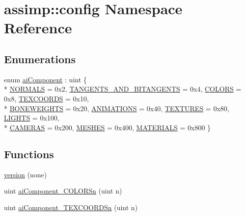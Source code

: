 \hypertarget{namespaceassimp_1_1config}{\section{assimp\+:\+:config Namespace Reference}
\label{namespaceassimp_1_1config}
}
\subsection*{Enumerations}
\begin{DoxyCompactItemize}
\item 
enum \hyperlink{namespaceassimp_1_1config_ad1b64b8f67159b86655b820ed6f75e62}{ai\+Component} \+: uint \{ \\*
\hyperlink{namespaceassimp_1_1config_ad1b64b8f67159b86655b820ed6f75e62a3036ae84279c4847b9d225ad8ff4a93d}{N\+O\+R\+M\+A\+L\+S} = 0x2, 
\hyperlink{namespaceassimp_1_1config_ad1b64b8f67159b86655b820ed6f75e62a0ccc4db28b70bd3cc3570e0b07dc875f}{T\+A\+N\+G\+E\+N\+T\+S\+\_\+\+A\+N\+D\+\_\+\+B\+I\+T\+A\+N\+G\+E\+N\+T\+S} = 0x4, 
\hyperlink{namespaceassimp_1_1config_ad1b64b8f67159b86655b820ed6f75e62a4ae7c781c0d6819cbef78edf2cc0120c}{C\+O\+L\+O\+R\+S} = 0x8, 
\hyperlink{namespaceassimp_1_1config_ad1b64b8f67159b86655b820ed6f75e62a1364ad1331ee57b8a3981a9143fc697e}{T\+E\+X\+C\+O\+O\+R\+D\+S} = 0x10, 
\\*
\hyperlink{namespaceassimp_1_1config_ad1b64b8f67159b86655b820ed6f75e62a04b79dc2b8de240eba72f2ec9b807284}{B\+O\+N\+E\+W\+E\+I\+G\+H\+T\+S} = 0x20, 
\hyperlink{namespaceassimp_1_1config_ad1b64b8f67159b86655b820ed6f75e62a8c183d7b15080ebc8f9fba3fa68e8001}{A\+N\+I\+M\+A\+T\+I\+O\+N\+S} = 0x40, 
\hyperlink{namespaceassimp_1_1config_ad1b64b8f67159b86655b820ed6f75e62a581dd6dae3ec70a700c8ad13518333a9}{T\+E\+X\+T\+U\+R\+E\+S} = 0x80, 
\hyperlink{namespaceassimp_1_1config_ad1b64b8f67159b86655b820ed6f75e62a1e1c5a066e40e660862f6510dd6ca09f}{L\+I\+G\+H\+T\+S} = 0x100, 
\\*
\hyperlink{namespaceassimp_1_1config_ad1b64b8f67159b86655b820ed6f75e62a799478edd1eac8cef184dd5b7bbd7f49}{C\+A\+M\+E\+R\+A\+S} = 0x200, 
\hyperlink{namespaceassimp_1_1config_ad1b64b8f67159b86655b820ed6f75e62ac1294d5c150606d309710f98e4a7fead}{M\+E\+S\+H\+E\+S} = 0x400, 
\hyperlink{namespaceassimp_1_1config_ad1b64b8f67159b86655b820ed6f75e62af4a7d4d7f020b186ec599f2cb9d83413}{M\+A\+T\+E\+R\+I\+A\+L\+S} = 0x800
 \}
\end{DoxyCompactItemize}
\subsection*{Functions}
\begin{DoxyCompactItemize}
\item 
\hyperlink{namespaceassimp_1_1config_a189983b3de0c76ecf09232745fb3c291}{version} (none)
\item 
uint \hyperlink{namespaceassimp_1_1config_a835b3f17f5656b5dac22e59791f76590}{ai\+Component\+\_\+\+C\+O\+L\+O\+R\+Sn} (uint n)
\item 
uint \hyperlink{namespaceassimp_1_1config_a55ef6b31818adb9b435cfcd31a49ec45}{ai\+Component\+\_\+\+T\+E\+X\+C\+O\+O\+R\+D\+Sn} (uint n)
\end{DoxyCompactItemize}
